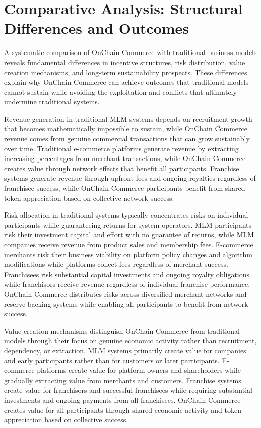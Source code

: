 \documentclass[
  Letterpaper,
]{scrbook}
\begin{document}
\section{Comparative Analysis: Structural Differences and
Outcomes}\label{comparative-analysis-structural-differences-and-outcomes}

A systematic comparison of OnChain Commerce with traditional business
models reveals fundamental differences in incentive structures, risk
distribution, value creation mechanisms, and long-term sustainability
prospects. These differences explain why OnChain Commerce can achieve
outcomes that traditional models cannot sustain while avoiding the
exploitation and conflicts that ultimately undermine traditional
systems.

Revenue generation in traditional MLM systems depends on recruitment
growth that becomes mathematically impossible to sustain, while OnChain
Commerce revenue comes from genuine commercial transactions that can
grow sustainably over time. Traditional e-commerce platforms generate
revenue by extracting increasing percentages from merchant transactions,
while OnChain Commerce creates value through network effects that
benefit all participants. Franchise systems generate revenue through
upfront fees and ongoing royalties regardless of franchisee success,
while OnChain Commerce participants benefit from shared token
appreciation based on collective network success.

Risk allocation in traditional systems typically concentrates risks on
individual participants while guaranteeing returns for system operators.
MLM participants risk their investment capital and effort with no
guarantee of returns, while MLM companies receive revenue from product
sales and membership fees. E-commerce merchants risk their business
viability on platform policy changes and algorithm modifications while
platforms collect fees regardless of merchant success. Franchisees risk
substantial capital investments and ongoing royalty obligations while
franchisors receive revenue regardless of individual franchise
performance. OnChain Commerce distributes risks across diversified
merchant networks and reserve backing systems while enabling all
participants to benefit from network success.

Value creation mechanisms distinguish OnChain Commerce from traditional
models through their focus on genuine economic activity rather than
recruitment, dependency, or extraction. MLM systems primarily create
value for companies and early participants rather than for customers or
later participants. E-commerce platforms create value for platform
owners and shareholders while gradually extracting value from merchants
and customers. Franchise systems create value for franchisors and
successful franchisees while requiring substantial investments and
ongoing payments from all franchisees. OnChain Commerce creates value
for all participants through shared economic activity and token
appreciation based on collective success.
\end{document}
